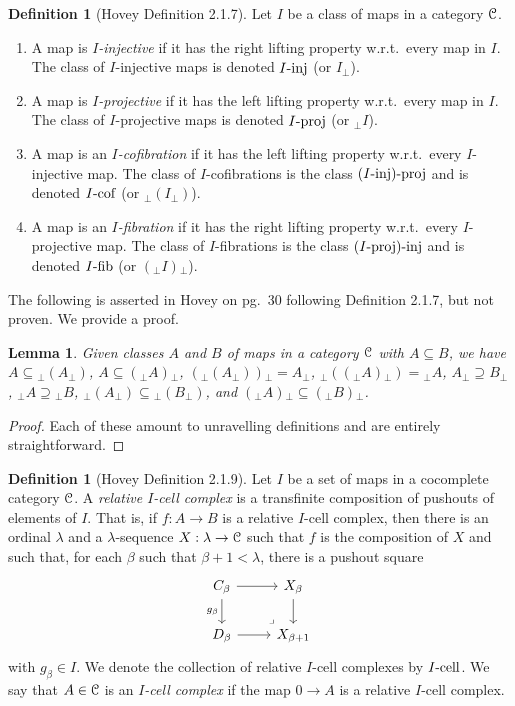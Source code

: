 \documentclass{amsart}
\theoremstyle{plain}
\newtheorem{lemma}[theorem]{Lemma}
\theoremstyle{definition}
\newtheorem{definition}[theorem]{Definition}
\newcommand{\sseq}{\subseteq}
\newcommand{\spseq}{\supseteq}
\newcommand{\0}{\mathbf{0}}
\newcommand{\cC}{\mathcal C}
\newcommand{\p}{{_\perp}}
\renewcommand{\(}{\left(}
\renewcommand{\)}{\right)}
\def\scr{\EuScript}
\def\cC{\scr{C}}
\newcommand{\inj}{\text-\mathrm{inj}}
\newcommand{\proj}{\text-\mathrm{proj}}
\newcommand{\fib}{\text-\mathrm{fib}}
\newcommand{\cell}{\text-\mathrm{cell}}
\newcommand{\cof}{\text-\mathrm{cof}}
\begin{document}
\begin{definition}[Hovey Definition 2.1.7]
  Let $I$ be a class of maps in a category $\cC$.\begin{enumerate}
    \item A map is \textit{$I$-injective} if it has the right lifting property w.r.t.\ every map in $I$. The class of $I$-injective maps is denoted $I\inj$ (or $I\p$).
    \item A map is \textit{$I$-projective} if it has the left lifting property w.r.t.\ every map in $I$. The class of $I$-projective maps is denoted $I\proj$ (or $\p I$).
    \item A map is an \textit{$I$-cofibration} if it has the left lifting property w.r.t.\ every $I$-injective map. The class of $I$-cofibrations is the class $(I\inj)\proj$ and is denoted $I\cof$ (or $\p(I\p)$).
    \item A map is an \textit{$I$-fibration} if it has the right lifting property w.r.t.\ every $I$-projective map. The class of $I$-fibrations is the class $(I\proj)\inj$ and is denoted $I\fib$ (or $(\p I)\p$).
  \end{enumerate}
\end{definition}

The following is asserted in Hovey on pg.\ 30 following Definition 2.1.7, but not proven. We provide a proof.

\begin{lemma}\label{useful_LP_properties}
  Given classes $A$ and $B$ of maps in a category $\cC$ with $A\sseq B$, we have $A\sseq {\p(A\p)}$, $A\sseq (\p A)\p$, $(\p(A\p))\p=A\p$, $\p((\p A)\p)={\p A}$, $A\p\spseq B\p$, $\p A\spseq {\p B}$, ${\p(A\p)}\sseq {\p(B\p)}$, and $(\p A)\p\sseq (\p B)\p$.
\end{lemma}
\begin{proof}
  Each of these amount to unravelling definitions and are entirely straightforward.
\end{proof}

\begin{definition}[Hovey Definition 2.1.9]
  Let $I$ be a set of maps in a cocomplete category $\cC$. A \textit{relative $I$-cell complex} is a transfinite composition of pushouts of elements of $I$. That is, if $f:A\to B$ is a relative $I$-cell complex, then there is an ordinal $\lambda$ and a $\lambda$-sequence $X:\lambda\to\cC$ such that $f$ is the composition of $X$ and such that, for each $\beta$ such that $\beta+1<\lambda$, there is a pushout square
  \[\begin{tikzcd}
    {C_\beta} & {X_\beta} \\
    {D_\beta} & {X_{\beta+1}}
    \arrow[from=1-1, to=1-2]
    \arrow[from=1-2, to=2-2]
    \arrow[from=2-1, to=2-2]
    \arrow["\ulcorner"{anchor=center, pos=0.125, rotate=180}, draw=none, from=2-2, to=1-1]
    \arrow["{g_\beta}"', from=1-1, to=2-1]
  \end{tikzcd}\]
  with $g_\beta\in I$. We denote the collection of relative $I$-cell complexes by $I\cell$. We say that $A\in\cC$ is an \textit{$I$-cell complex} if the map $0\to A$ is a relative $I$-cell complex.
\end{definition}
\end{document}
